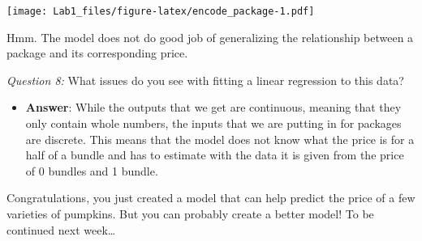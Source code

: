\documentclass[
]{article}
\providecommand{\tightlist}{%
  \setlength{\itemsep}{0pt}\setlength{\parskip}{0pt}}
\begin{document}
\texttt{[image: Lab1\_files/figure-latex/encode\_package-1.pdf]}

Hmm. The model does not do good job of generalizing the relationship
between a package and its corresponding price.

\emph{Question 8:} What issues do you see with fitting a linear
regression to this data?

\begin{itemize}
\tightlist
\item
  \textbf{Answer}: While the outputs that we get are continuous, meaning
  that they only contain whole numbers, the inputs that we are putting
  in for packages are discrete. This means that the model does not know
  what the price is for a half of a bundle and has to estimate with the
  data it is given from the price of 0 bundles and 1 bundle.
\end{itemize}

Congratulations, you just created a model that can help predict the
price of a few varieties of pumpkins. But you can probably create a
better model! To be continued next week\ldots{}
\end{document}
